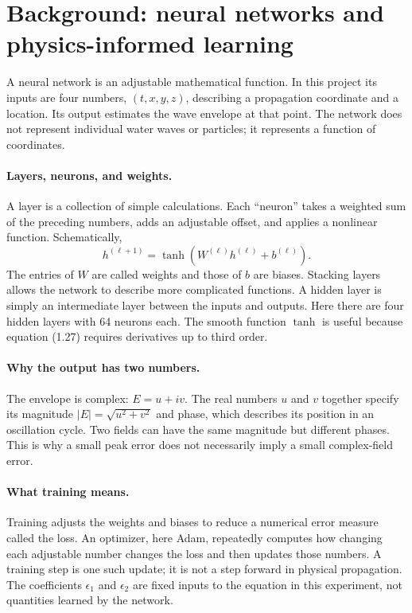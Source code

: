 \documentclass[10pt]{article}
\begin{document}

\clearpage
\section{Background: neural networks and physics-informed learning}
A neural network is an adjustable mathematical function. In this project its inputs are four numbers, $(t,x,y,z)$, describing a propagation coordinate and a location. Its output estimates the wave envelope at that point. The network does not represent individual water waves or particles; it represents a function of coordinates.

\paragraph{Layers, neurons, and weights.}
A layer is a collection of simple calculations. Each ``neuron'' takes a weighted sum of the preceding numbers, adds an adjustable offset, and applies a nonlinear function. Schematically,
\[
h^{(\ell+1)}=\tanh\!\left(W^{(\ell)}h^{(\ell)}+b^{(\ell)}\right).
\]
The entries of $W$ are called weights and those of $b$ are biases. Stacking layers allows the network to describe more complicated functions. A hidden layer is simply an intermediate layer between the inputs and outputs. Here there are four hidden layers with 64 neurons each. The smooth function $\tanh$ is useful because equation (1.27) requires derivatives up to third order.

\paragraph{Why the output has two numbers.}
The envelope is complex: $E=u+iv$. The real numbers $u$ and $v$ together specify its magnitude $|E|=\sqrt{u^2+v^2}$ and phase, which describes its position in an oscillation cycle. Two fields can have the same magnitude but different phases. This is why a small peak error does not necessarily imply a small complex-field error.

\paragraph{What training means.}
Training adjusts the weights and biases to reduce a numerical error measure called the loss. An optimizer, here Adam, repeatedly computes how changing each adjustable number changes the loss and then updates those numbers. A training step is one such update; it is not a step forward in physical propagation. The coefficients $\epsilon_1$ and $\epsilon_2$ are fixed inputs to the equation in this experiment, not quantities learned by the network.
\end{document}
